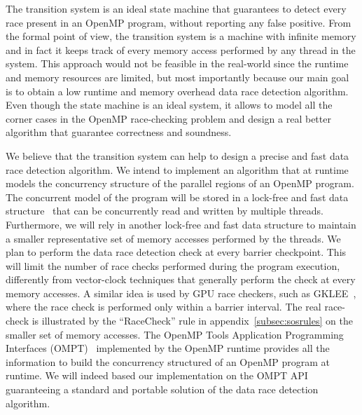 The transition system is an ideal state machine that guarantees to detect
every race present in an OpenMP program, without reporting any false positive.
%
From the formal point of view, the transition system is a machine with
infinite memory and in fact it keeps track of every memory access performed by
any thread in the system.
%
This approach would not be feasible in the real-world since the runtime and
memory resources are limited, but most importantly because our main goal is to
obtain a low runtime and memory overhead data race detection algorithm.
%
Even though the state machine is an ideal system, it allows to model all the
corner cases in the OpenMP race-checking problem and design a real better
algorithm that guarantee correctness and soundness.

We believe that the transition system can help to design a precise and fast
data race detection algorithm.
%
We intend to implement an algorithm that at runtime models the concurrency
structure of the parallel regions of an OpenMP program.
%
The concurrent model of the program will be stored in a lock-free and fast
data structure~\cite{5871597, Matveev:2015:RLS:2815400.2815406} that can
be concurrently read and written by multiple threads.
%
Furthermore, we will rely in another lock-free and fast data structure to
maintain a smaller representative set of memory accesses performed by the
threads.
%
We plan to perform the data race detection check at every barrier checkpoint.
%
This will limit the number of race checks performed during the program
execution, differently from vector-clock techniques that generally perform the
check at every memory accesses.
%
A similar idea is used by GPU race checkers, such as
GKLEE~\cite{DBLP:conf/sc/LiLG14}, where the race check is performed only
within a barrier interval.
%
The real race-check is illustrated by the ``RaceCheck'' rule in
appendix~\ref{subsec:sosrules} on the smaller set of memory accesses.
%
The OpenMP Tools Application Programming Interfaces (OMPT)~\cite{ompt}
implemented by the OpenMP runtime provides all the information to build the
concurrency structured of an OpenMP program at runtime.
%
We will indeed based our implementation on the OMPT API guaranteeing a
standard and portable solution of the data race detection algorithm.

